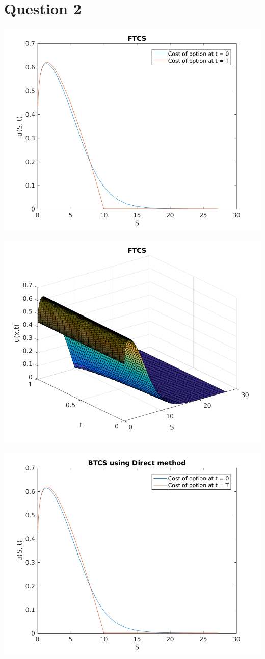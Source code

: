 \documentclass{article}
\begin{document}
\section{Question 2}

\includegraphics{"q2_1"}
\pagebreak


\includegraphics{"q2_2"}
\pagebreak


\includegraphics{"q2_3"}
\pagebreak
\end{document}
